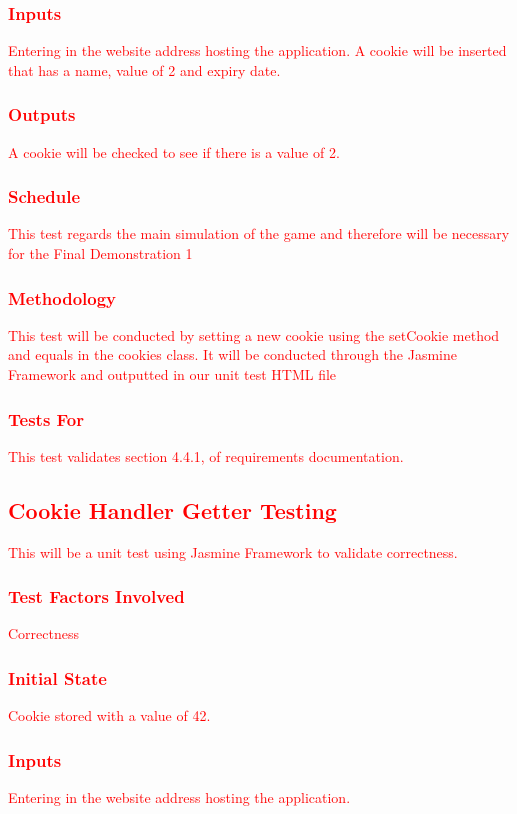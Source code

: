 \documentclass[11pt, oneside]{article}   	%
\begin{document}
\subsubsection{\textcolor{red}{Inputs}}
\textcolor{red}{Entering in the website address hosting the application. A cookie will be inserted that has a name, value of 2 and expiry date.}
\subsubsection{\textcolor{red}{Outputs}}
\textcolor{red}{A cookie will be checked to see if there is a value of 2.}
\subsubsection{\textcolor{red}{Schedule}}
\textcolor{red}{This test regards the main simulation of the game and therefore will be necessary for the Final Demonstration 1}
\subsubsection{\textcolor{red}{Methodology}}
\textcolor{red}{This test will be conducted by setting a new cookie using the setCookie method and equals in the cookies class. It will be conducted through the Jasmine Framework and outputted in our unit test HTML file}
\subsubsection{\textcolor{red}{Tests For}}
\textcolor{red}{This test validates section 4.4.1, of requirements documentation.}



\subsection{\textcolor{red}{Cookie Handler Getter Testing}}
\textcolor{red}{This will be a unit test using Jasmine Framework to validate correctness.}
\subsubsection{\textcolor{red}{Test Factors Involved}}
\textcolor{red}{Correctness}
\subsubsection{\textcolor{red}{Initial State}}
\textcolor{red}{Cookie stored with a value of 42.}
\subsubsection{\textcolor{red}{Inputs}}
\textcolor{red}{Entering in the website address hosting the application. }
\end{document}
